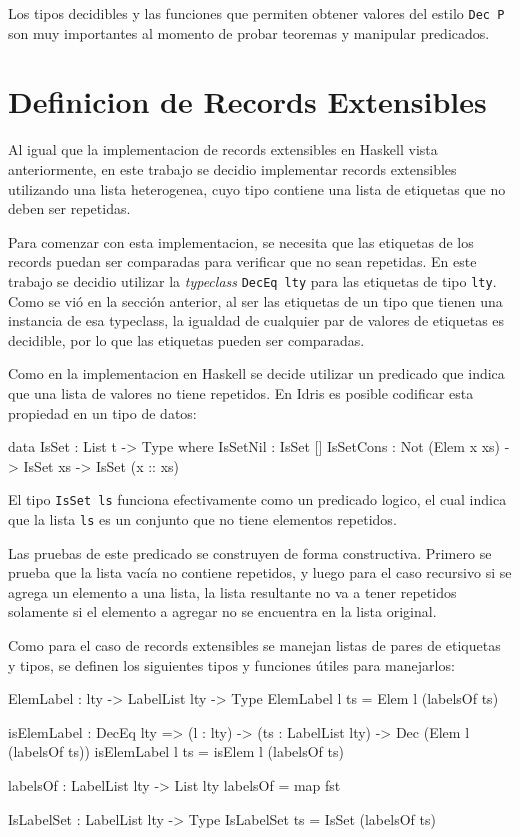 Los tipos decidibles y las funciones que permiten obtener valores del estilo \texttt{Dec P} son muy importantes al momento de probar teoremas y manipular predicados.

\section{Definicion de Records Extensibles}

Al igual que la implementacion de records extensibles en Haskell vista anteriormente, en este trabajo se decidio implementar records extensibles utilizando una lista heterogenea, cuyo tipo contiene una lista de etiquetas que no deben ser repetidas.

Para comenzar con esta implementacion, se necesita que las etiquetas de los records puedan ser comparadas para verificar que no sean repetidas. En este trabajo se decidio utilizar la \textit{typeclass} \texttt{DecEq lty} para las etiquetas de tipo \texttt{lty}. Como se vió en la sección anterior, al ser las etiquetas de un tipo que tienen una instancia de esa typeclass, la igualdad de cualquier par de valores de etiquetas es decidible, por lo que las etiquetas pueden ser comparadas.

Como en la implementacion en Haskell se decide utilizar un predicado que indica que una lista de valores no tiene repetidos.
En Idris es posible codificar esta propiedad en un tipo de datos:

\begin{code}
data IsSet : List t -> Type where
  IsSetNil : IsSet []
  IsSetCons : Not (Elem x xs) -> IsSet xs -> 
    IsSet (x :: xs)
\end{code}

El tipo \texttt{IsSet ls} funciona efectivamente como un predicado logico, el cual indica que la lista \texttt{ls} es un conjunto que no tiene elementos repetidos.

Las pruebas de este predicado se construyen de forma constructiva. Primero se prueba que la lista vacía no contiene repetidos, y luego para el caso recursivo si se agrega un elemento a una lista, la lista resultante no va a tener repetidos solamente si el elemento a agregar no se encuentra en la lista original.

Como para el caso de records extensibles se manejan listas de pares de etiquetas y tipos, se definen los siguientes tipos y funciones útiles para manejarlos:

\begin{code}
ElemLabel : lty -> LabelList lty -> Type
ElemLabel l ts = Elem l (labelsOf ts)

isElemLabel : DecEq lty => (l : lty) -> 
  (ts : LabelList lty) -> 
  Dec (Elem l (labelsOf ts))
isElemLabel l ts = isElem l (labelsOf ts)

labelsOf : LabelList lty -> List lty
labelsOf = map fst

IsLabelSet : LabelList lty -> Type
IsLabelSet ts = IsSet (labelsOf ts)  
\end{code}

